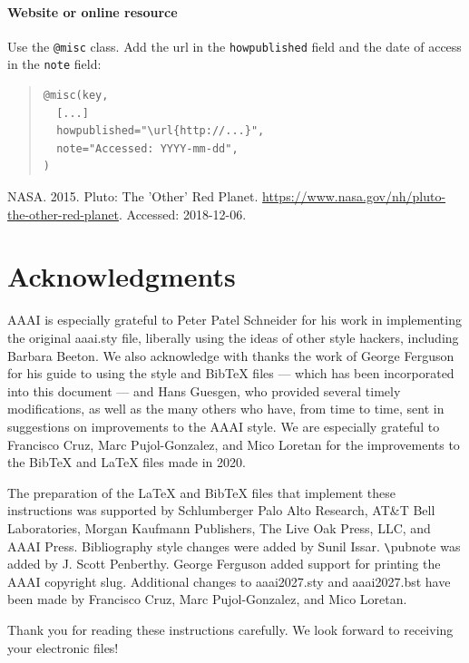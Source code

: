 \paragraph{Website or online resource} Use the \texttt{@misc} class. Add the url in the \texttt{howpublished} field and the date of access in the \texttt{note} field:
\begin{quote}
\begin{footnotesize}
\begin{verbatim}
@misc(key,
  [...]
  howpublished="\url{http://...}",
  note="Accessed: YYYY-mm-dd",
)
\end{verbatim}
\end{footnotesize}
\end{quote}
\nocite{c:23}
{NASA}. 2015.
\newblock Pluto: The 'Other' Red Planet.
\newblock \url{https://www.nasa.gov/nh/pluto-the-other-red-planet}.
\newblock Accessed: 2018-12-06.

\section*{Acknowledgments}
AAAI is especially grateful to Peter Patel Schneider for his work in implementing the original aaai.sty file, liberally using the ideas of other style hackers, including Barbara Beeton. We also acknowledge with thanks the work of George Ferguson for his guide to using the style and BibTeX files --- which has been incorporated into this document --- and Hans Guesgen, who provided several timely modifications, as well as the many others who have, from time to time, sent in suggestions on improvements to the AAAI style. We are especially grateful to Francisco Cruz, Marc Pujol-Gonzalez, and Mico Loretan for the improvements to the Bib\TeX{} and \LaTeX{} files made in 2020.

The preparation of the \LaTeX{} and Bib\TeX{} files that implement these instructions was supported by Schlumberger Palo Alto Research, AT\&T Bell Laboratories, Morgan Kaufmann Publishers, The Live Oak Press, LLC, and AAAI Press. Bibliography style changes were added by Sunil Issar. \verb+\+pubnote was added by J. Scott Penberthy. George Ferguson added support for printing the AAAI copyright slug. Additional changes to aaai2027.sty and aaai2027.bst have been made by Francisco Cruz, Marc Pujol-Gonzalez, and Mico Loretan.

\bigskip
\noindent Thank you for reading these instructions carefully. We look forward to receiving your electronic files!
